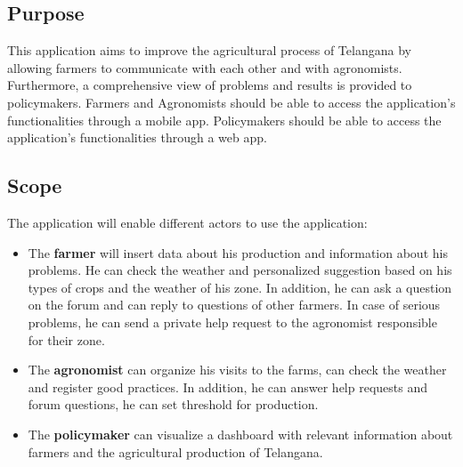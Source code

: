 \subsection{Purpose}
This application aims to improve the agricultural process of Telangana by allowing farmers to communicate with each other and with agronomists.
Furthermore, a comprehensive view of problems and results is provided to policymakers.
Farmers and  Agronomists should be able to access the application's functionalities through a mobile app. Policymakers should be able to access the application's functionalities through a web app.
\subsection{Scope}
The application will enable different actors to use the application:

\begin{itemize}
    \item The \textbf{farmer} will insert data about his production and information about his problems. He can check the weather and personalized suggestion based on his types of crops and the weather of his zone. In addition, he can ask a question on the forum and can reply to questions of other farmers. In case of serious problems, he can send a private help request to the agronomist responsible for their zone.
    \item The \textbf{agronomist} can organize his visits to the farms, can check the weather and register good practices. In addition, he can answer help requests and forum questions, he can set threshold for production.
    \item The \textbf{policymaker} can visualize a dashboard with relevant information about farmers and the agricultural production of Telangana.
\end{itemize}